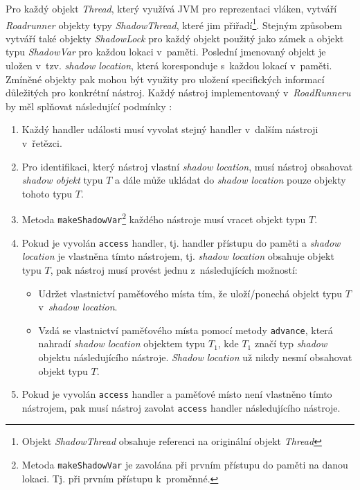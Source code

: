 Pro každý objekt \textit{Thread}, který využívá JVM pro reprezentaci vláken, vytváří \textit{Roadrunner} objekty typy \textit{ShadowThread}, které jim přiřadí\footnote{Objekt \textit{ShadowThread} obsahuje referenci na originální objekt \textit{Thread}}. Stejným způsobem vytváří také objekty \textit{ShadowLock} pro každý objekt použitý jako zámek a objekt typu \textit{ShadowVar} pro každou lokaci v~paměti. Poslední jmenovaný objekt je uložen v~tzv. \textit{shadow location}, která koresponduje s~každou lokací v~paměti. Zmíněné objekty pak mohou být využity pro uložení specifických informací důležitých pro konkrétní nástroj.
Každý nástroj implementovaný v~\textit{RoadRunneru} by měl splňovat následující podmínky \cite{cite:rr}:
\begin{enumerate}
\item Každý handler události musí vyvolat stejný handler v~dalším nástroji v~řetězci.
\item Pro identifikaci, který nástroj vlastní \textit{shadow location}, musí nástroj obsahovat \textit{shadow objekt} typu $T$ a dále může ukládat do \textit{shadow location} pouze objekty tohoto typu $T$.
\item Metoda \texttt{makeShadowVar}\footnote{Metoda \texttt{makeShadowVar} je zavolána při prvním přístupu do paměti na danou lokaci. Tj. při prvním přístupu k~proměnné.} každého nástroje musí vracet objekt typu $T$.
\item{Pokud je vyvolán \texttt{access} handler, tj. handler přístupu do paměti a \textit{shadow location} je vlastněna tímto nástrojem, tj. \textit{shadow location} obsahuje objekt typu $T$, pak nástroj musí provést jednu z~následujících možností:
	\begin{itemize}
	\item Udržet vlastnictví paměťového místa tím, že uloží/ponechá objekt typu $T$ v~\textit{shadow location}.
	\item{Vzdá se vlastnictví paměťového místa pomocí metody \texttt{advance}, která nahradí \textit{shadow location} objektem typu $T_1$, kde $T_1$ značí typ \textit{shadow} objektu následujícího nástroje. \textit{Shadow location} už nikdy nesmí obsahovat objekt typu $T$.}
	\end{itemize}
}
\item Pokud je vyvolán \texttt{access} handler a paměťové místo není vlastněno tímto nástrojem, pak musí nástroj zavolat \texttt{access} handler následujícího nástroje.
\end{enumerate}

